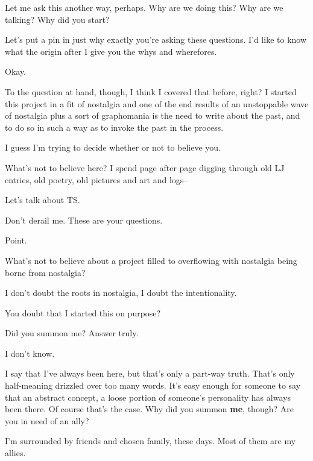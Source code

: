\begin{ally}
Let me ask this another way, perhaps. Why are we doing this? Why are we talking? Why did you start?
\end{ally}
Let's put a pin in just why exactly you're asking these questions. I'd like to know what the origin after I give you the whys and wherefores.

\begin{ally}
Okay.
\end{ally}
To the question at hand, though, I think I covered that before, right? I started this project in a fit of nostalgia and one of the end results of an unstoppable wave of nostalgia plus a sort of graphomania is the need to write about the past, and to do so in such a way as to invoke the past in the process.

\begin{ally}
I guess I'm trying to decide whether or not to believe you.
\end{ally}
What's not to believe here? I spend page after page digging through old LJ entries, old poetry, old pictures and art and logs--

\begin{ally}
Let's talk about TS.
\end{ally}
Don't derail me. These are your questions.

\begin{ally}
Point.
\end{ally}
What's not to believe about a project filled to overflowing with nostalgia being borne from nostalgia?

\begin{ally}
I don't doubt the roots in nostalgia, I doubt the intentionality.
\end{ally}
You doubt that I started this on purpose?

\begin{ally}
Did you summon me? Answer truly.
\end{ally}
I don't know.

\begin{ally}
I say that I've always been here, but that's only a part-way truth. That's only half-meaning drizzled over too many words. It's easy enough for someone to say that an abstract concept, a loose portion of someone's personality has always been there. Of course that's the case. Why did you summon \textbf{me}, though? Are you in need of an ally?
\end{ally}
I'm surrounded by friends and chosen family, these days. Most of them are my allies.

